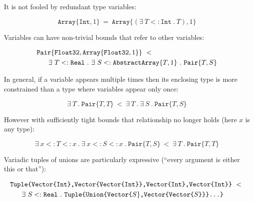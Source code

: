 \vspace{-1ex}
\noindent
It is not fooled by redundant type variables:

\vspace{-2ex}
\[
\texttt{Array}\{\texttt{Int},1\}\ =\ 
  \texttt{Array}\{(\exists\ T<:\texttt{Int}\ .\ T), 1\} \]

\noindent
Variables can have non-trivial bounds that refer to other variables:

\vspace{-3ex}
\begin{singlespace}
\begin{align*}
&\texttt{Pair}\{\texttt{Float32},\texttt{Array}\{\texttt{Float32},1\}\}\ <\ \\
&\hspace{4ex}\exists\ T<:\texttt{Real}\ .\ \exists\ S<:\texttt{AbstractArray}\{T,1\}\ .\ \texttt{Pair}\{T,S\}
\end{align*}
\end{singlespace}


\noindent
In general, if a variable appears multiple times then its enclosing type is
more constrained than a type where variables appear only once:

\vspace{-3ex}
\[
\exists\ T\ .\ \texttt{Pair}\{T,T\}\ <\ \exists\ T\ .\ \exists\ S\ .\ \texttt{Pair}\{T,S\}
\]

\noindent
However with sufficiently tight bounds that relationship no longer holds
(here $x$ is any type):

\vspace{-3ex}
\[
\exists\ x<:T<:x\ .\ \exists\ x<:S<:x\ .\ \texttt{Pair}\{T,S\}\ <\ \exists\ T\ .\ \texttt{Pair}\{T,T\}
\]


\noindent
Variadic tuples of unions are particularly expressive (``every argument is
either this or that''):

\vspace{-3ex}
\begin{singlespace}
\begin{align*}
&\texttt{Tuple\{Vector\{Int\},Vector\{Vector\{Int\}\},Vector\{Int\},Vector\{Int\}\}}\ <\ \\
&\hspace{4ex}\exists\ S<:\texttt{Real}\ .\ \texttt{Tuple\{Union\{Vector\{}S\}\texttt{,Vector\{Vector\{}S\texttt{\}\}\}...\}}
\end{align*}
\end{singlespace}

